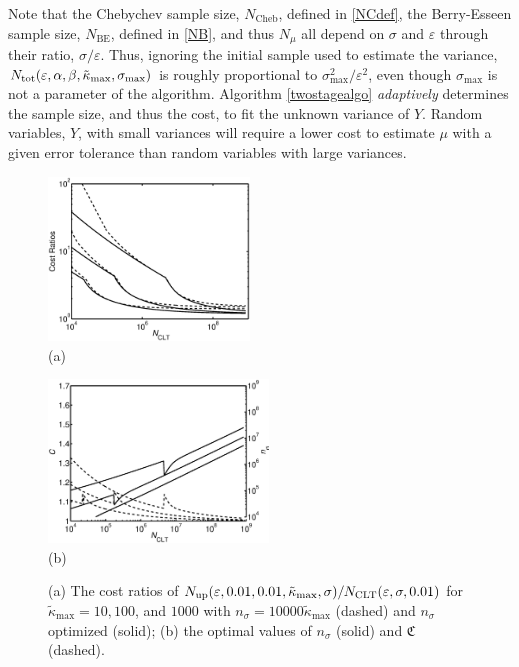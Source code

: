 \documentclass[graybox]{svmult}
\newcommand{\fudge}{\mathfrak{C}}
\newcommand{\tkappa}{\tilde{\kappa}}
\begin{document}
Note that the Chebychev sample size, $N_{\text{Cheb}}$, defined in \eqref{NCdef}, the Berry-Esseen sample size, $N_{\text{BE}}$, defined in \eqref{NB}, and thus $N_\mu$ all depend on $\sigma$ and $\varepsilon$ through their ratio, $\sigma/\varepsilon$.  Thus, ignoring the initial sample used to estimate the variance, $N_{\rm{tot}}(\varepsilon,\alpha, \beta,\tkappa_{\max}, \sigma_{\max})$ is roughly proportional to $\sigma^2_{\max}/\varepsilon^{2}$, even though $\sigma_{\max}$ is not a parameter of the algorithm.  Algorithm \ref{twostagealgo} \emph{adaptively} determines the sample size, and thus the cost, to fit the unknown variance of $Y$. Random variables, $Y$, with small variances will require a lower cost to estimate $\mu$ with a given error tolerance than random variables with large variances. 


\begin{figure}
\centering
\begin{minipage}{2.1in}
\centering \includegraphics[width=2.1in]{MCSampleSizes} \\
(a)
\end{minipage}
\quad 
\begin{minipage}{2.3in}\centering
\includegraphics[width=2.3in]{MCnsigmafudge}\\
(b)
\end{minipage}
\caption{(a) The cost ratios of $N_{\rm{up}}(\varepsilon,0.01,0.01, \tkappa_{\max}, \sigma)/N_{\mathrm{CLT}}(\varepsilon,\sigma,0.01)$ for $\tkappa_{\max}=10,100$, and $1000$ with $n_\sigma=10000\tkappa_{\max}$ (dashed) and $n_\sigma$ optimized (solid); (b) the optimal values of $n_\sigma$ (solid) and $\fudge$ (dashed).\label{Costfig}}
\end{figure}
\end{document}
